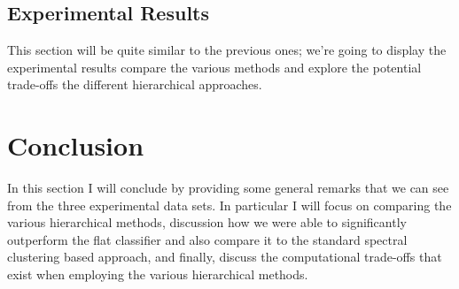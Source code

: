 \documentclass[../thesis.tex]{subfiles}
\begin{document}
\subsection{Experimental Results}
This section will be quite similar to the previous ones; we're going to display the experimental results compare the various methods and explore the potential trade-offs the different hierarchical approaches.

\section{Conclusion}
In this section I will conclude by providing some general remarks that we can see from the three experimental data sets. In particular I will focus on comparing the various hierarchical methods, discussion how we were able to significantly outperform the flat classifier and also compare it to the standard spectral clustering based approach, and finally, discuss the computational trade-offs that exist when employing the various hierarchical methods. 
\end{document}

